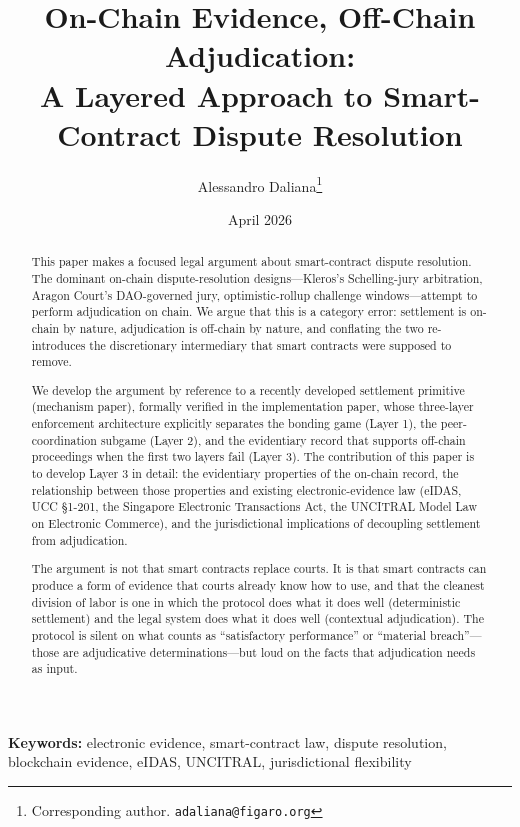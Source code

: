 \documentclass[11pt,a4paper]{article}
\title{%
  On-Chain Evidence, Off-Chain Adjudication:\\
  A Layered Approach to Smart-Contract Dispute Resolution%
}
\author{
  Alessandro Daliana\thanks{Corresponding author. \texttt{adaliana@figaro.org}}
}
\date{April 2026}
\theoremstyle{remark}
\begin{document}
\maketitle

\begin{abstract}
This paper makes a focused legal argument about smart-contract
dispute resolution. The dominant on-chain dispute-resolution
designs---Kleros's Schelling-jury arbitration, Aragon Court's
DAO-governed jury, optimistic-rollup challenge windows---attempt
to perform adjudication on chain. We argue that this is a
category error: settlement is on-chain by nature, adjudication is
off-chain by nature, and conflating the two re-introduces the
discretionary intermediary that smart contracts were supposed to
remove.

We develop the argument by reference to a recently developed
settlement primitive (mechanism paper), formally
verified in the implementation paper, whose three-layer enforcement
architecture explicitly separates the bonding game (Layer 1), the
peer-coordination subgame (Layer 2), and the evidentiary record
that supports off-chain proceedings when the first two layers fail
(Layer 3). The contribution of this paper is to develop Layer 3 in
detail: the evidentiary properties of the on-chain record, the
relationship between those properties and existing
electronic-evidence law (eIDAS, UCC §1-201, the Singapore
Electronic Transactions Act, the UNCITRAL Model Law on Electronic
Commerce), and the jurisdictional implications of decoupling
settlement from adjudication.

The argument is not that smart contracts replace courts. It is
that smart contracts can produce a form of evidence that courts
already know how to use, and that the cleanest division of labor
is one in which the protocol does what it does well (deterministic
settlement) and the legal system does what it does well
(contextual adjudication). The protocol is silent on what counts
as ``satisfactory performance'' or ``material breach''---those are
adjudicative determinations---but loud on the facts that
adjudication needs as input.
\end{abstract}

\medskip
\noindent\textbf{Keywords:}
electronic evidence, smart-contract law, dispute resolution,
blockchain evidence, eIDAS, UNCITRAL, jurisdictional flexibility

\end{document}
